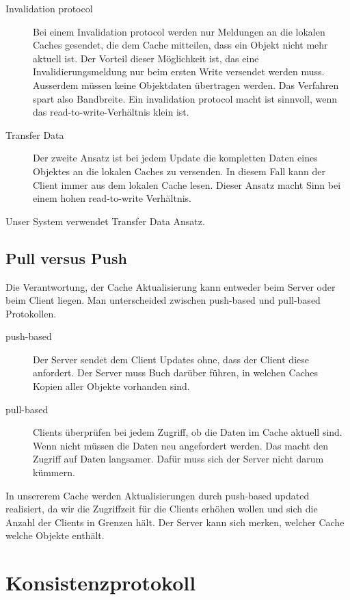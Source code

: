 \begin{description}
\item[Invalidation protocol] Bei einem Invalidation protocol werden nur Meldungen an die lokalen Caches gesendet, die dem Cache mitteilen, dass ein Objekt nicht mehr aktuell ist. Der Vorteil dieser Möglichkeit ist, das eine Invalidierungsmeldung nur beim ersten Write versendet werden muss. Ausserdem müssen keine Objektdaten übertragen werden. Das Verfahren spart also Bandbreite. Ein invalidation protocol macht ist sinnvoll, wenn das read-to-write-Verhältnis klein ist.
\item[Transfer Data] Der zweite Ansatz ist bei jedem Update die kompletten Daten eines Objektes an die lokalen Caches zu versenden. In diesem Fall kann der Client immer aus dem lokalen Cache lesen. Dieser Ansatz macht Sinn bei einem hohen read-to-write Verhältnis.
\end{description}

Unser System verwendet Transfer Data Ansatz.

\subsection{Pull versus Push}
\label{sec:pull-versus-push}

Die Verantwortung, der Cache Aktualisierung kann entweder beim Server oder beim Client liegen. Man unterscheided zwischen push-based und pull-based Protokollen.

\begin{description}
\item[push-based] Der Server sendet dem Client Updates ohne, dass der Client diese anfordert. Der Server muss Buch darüber führen, in welchen Caches Kopien aller Objekte vorhanden sind.
\item[pull-based] Clients überprüfen bei jedem Zugriff, ob die Daten im Cache aktuell sind. Wenn nicht müssen die Daten neu angefordert werden. Das macht den Zugriff auf Daten langsamer. Dafür muss sich der Server nicht darum kümmern.
\end{description}

In unsererem Cache werden Aktualisierungen durch push-based updated realisiert, da wir die Zugriffzeit für die Clients erhöhen wollen und sich die Anzahl der Clients in Grenzen hält. Der Server kann sich merken, welcher Cache welche Objekte enthält.

\section{Konsistenzprotokoll}
\label{sec:konsistenzprotokoll}

